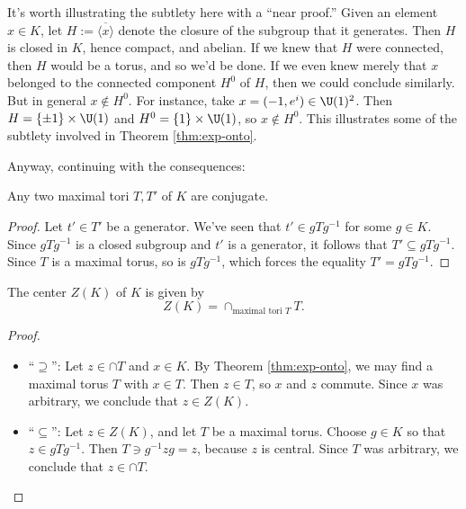 \documentclass[reqno]{amsart} 
\begin{document}
It's worth illustrating the subtlety here with a ``near proof.''  Given an element $x \in K$, let $H := \overline{\langle x \rangle}$ denote the closure of the subgroup that it generates.  Then $H$ is closed in $K$, hence compact, and abelian.  If we knew that $H$ were connected, then $H$ would be a torus, and so we'd be done.  If we even knew merely that $x$ belonged to the connected component $H^0$ of $H$, then we could conclude similarly.  But in general $x \notin H^0$.  For instance, take $x = (-1,e^i) \in \U(1)^2$.  Then $H = \{\pm 1\} \times \U(1)$ and $H^0 = \{1\} \times \U(1)$, so $x \notin H^0$.  This illustrates some of the subtlety involved in Theorem \ref{thm:exp-onto}.


Anyway, continuing with the consequences:
\begin{theorem}\label{thm:conj-max-tori}
  Any two maximal tori $T, T'$ of $K$ are conjugate.
\end{theorem}
\begin{proof}
  Let $t' \in T'$ be a generator.  We've seen that $t' \in g T g^{-1}$ for some $g \in K$.  Since $g T g^{-1}$ is a closed subgroup and $t'$ is a generator, it follows that $T' \subseteq g T g^{-1}$.  Since $T$ is a maximal torus, so is $g T g^{-1}$, which forces the equality $T' = g T g^{-1}$.
\end{proof}

\begin{theorem}
  The center $Z(K)$ of $K$ is given by
  \begin{equation*}
    Z(K) = \cap _{\text{maximal tori } T} T.
  \end{equation*}
\end{theorem}
\begin{proof}
  \begin{itemize}
  \item ``$\supseteq$'': Let $z \in \cap T$ and $x \in K$.  By Theorem \ref{thm:exp-onto}, we may find a maximal torus $T$ with $x \in T$.  Then $z \in T$, so $x$ and $z$ commute.  Since $x$ was arbitrary, we conclude that $z \in Z(K)$.
  \item ``$\subseteq$'': Let $z \in Z(K)$, and let $T$ be a maximal torus.  Choose $g \in K$ so that $z \in g T g ^{-1}$.  Then $T \ni g^{-1} z g = z$, because $z$ is central.  Since $T$ was arbitrary, we conclude that $z \in \cap T$.
  \end{itemize}
\end{proof}
\end{document}
